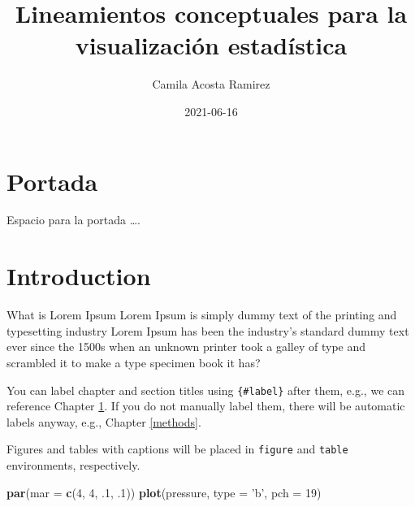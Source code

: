 \documentclass[
]{book}
\title{Lineamientos conceptuales para la visualización estadística}
\author{Camila Acosta Ramirez}
\date{2021-06-16}
\newenvironment{Shaded}{\begin{snugshade}}{\end{snugshade}}
\newcommand{\DataTypeTok}[1]{\textcolor[rgb]{0.13,0.29,0.53}{#1}}
\newcommand{\DecValTok}[1]{\textcolor[rgb]{0.00,0.00,0.81}{#1}}
\newcommand{\FloatTok}[1]{\textcolor[rgb]{0.00,0.00,0.81}{#1}}
\newcommand{\KeywordTok}[1]{\textcolor[rgb]{0.13,0.29,0.53}{\textbf{#1}}}
\newcommand{\NormalTok}[1]{#1}
\newcommand{\StringTok}[1]{\textcolor[rgb]{0.31,0.60,0.02}{#1}}
\begin{document}
\maketitle

{
\setcounter{tocdepth}{1}
\tableofcontents
}
\hypertarget{portada}{%
\chapter*{Portada}\label{portada}}

Espacio para la portada \ldots.

\hypertarget{intro}{%
\chapter{Introduction}\label{intro}}

What is Lorem Ipsum Lorem Ipsum is simply dummy text of the printing and typesetting industry Lorem Ipsum has been the industry's standard dummy text ever since the 1500s when an unknown printer took a galley of type and scrambled it to make a type specimen book it has?

You can label chapter and section titles using \texttt{\{\#label\}} after them, e.g., we can reference Chapter \ref{intro}. If you do not manually label them, there will be automatic labels anyway, e.g., Chapter \ref{methods}.

Figures and tables with captions will be placed in \texttt{figure} and \texttt{table} environments, respectively.

\begin{Shaded}
\begin{Highlighting}[]
\KeywordTok{par}\NormalTok{(}\DataTypeTok{mar =} \KeywordTok{c}\NormalTok{(}\DecValTok{4}\NormalTok{, }\DecValTok{4}\NormalTok{, }\FloatTok{.1}\NormalTok{, }\FloatTok{.1}\NormalTok{))}
\KeywordTok{plot}\NormalTok{(pressure, }\DataTypeTok{type =} \StringTok{'b'}\NormalTok{, }\DataTypeTok{pch =} \DecValTok{19}\NormalTok{)}
\end{Highlighting}
\end{Shaded}
\end{document}
